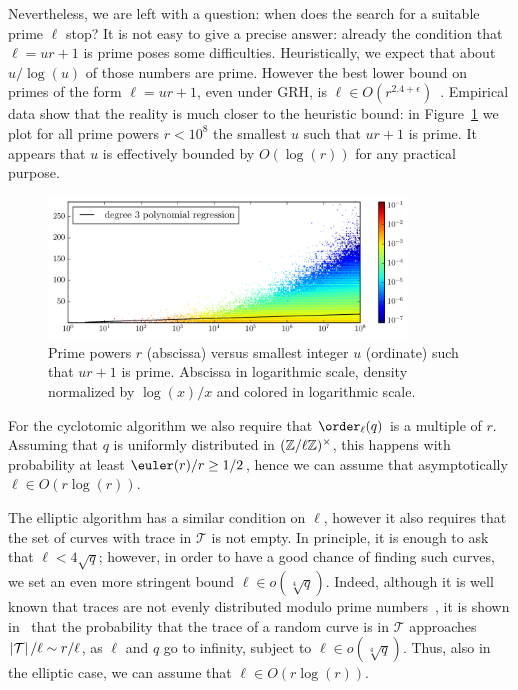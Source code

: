 Nevertheless, we are left with a question: when does the search for a
suitable prime $\ell$ stop? %
It is not easy to give a precise answer: already the condition that
$\ell=ur+1$ is prime poses some difficulties. Heuristically, we expect
that about $u/\log(u)$ of those numbers are prime. However the best
lower bound on primes of the form $\ell=ur+1$, even under GRH, is
$\ell\in O(r^{2.4+\epsilon})$~\cite{heath1992zero}. Empirical data
show that the reality is much closer to the heuristic bound: in
Figure~\ref{fig:primes-arith-prog} we plot for all prime powers
$r<10^8$ the smallest $u$ such that $ur+1$ is prime. It appears that
$u$ is effectively bounded by $O(\log(r))$ for any practical purpose.

\begin{figure}
  \centering
  \includegraphics[width=0.85\textwidth]{ffisom/arith_prog}
  \caption{Prime powers $r$ (abscissa) versus smallest integer $u$
    (ordinate) such that $ur+1$ is prime. Abscissa in logarithmic
    scale, density normalized by $\log(x)/x$ and colored in
    logarithmic scale.}
  \label{fig:primes-arith-prog}
\end{figure}

For the cyclotomic algorithm we also require that $\order_\ell(q)$ is
a multiple of $r$. %
Assuming that $q$ is uniformly distributed in $(\mathbb{Z}/\ell\mathbb{Z})^\times$,
this happens with probability at least $\euler(r)/r\ge 1/2$, hence we
can assume that asymptotically $\ell\in O(r\log(r))$. %

The elliptic algorithm has a similar condition on $\ell$, however it
also requires that the set of curves with trace in $\mathcal{T}$ is
not empty. %
In principle, it is enough to ask that $\ell<4\sqrt{q}$; however, in
order to have a good chance of finding such curves, we set an even
more stringent bound $\ell\in o(\sqrt[4]{q})$. %
Indeed, although it is well known that traces are not evenly
distributed modulo prime numbers~\cite{lenstra87}, it is shown
in~\cite[Th.~1]{castryck+hubrechts13} that the probability that the
trace of a random curve is in $\mathcal{T}$ approaches
$\left\vert\mathcal{T}\right\vert/\ell\sim r/\ell$, as $\ell$ and $q$ go to infinity,
subject to $\ell\in o(\sqrt[4]{q})$.  %
Thus, also in the elliptic case, we can assume that
$\ell\in O(r\log(r))$.

